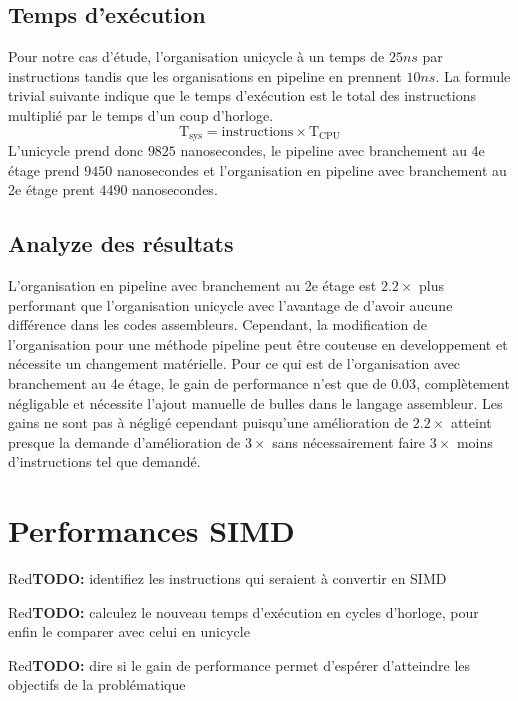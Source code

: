\documentclass[a11paper]{article}
\newcommand{\todo}[1]{\begin{color}{Red}\textbf{TODO:} #1\end{color}}
\begin{document}
\subsection{Temps d'exécution}
Pour notre cas d'étude, l'organisation unicycle à un temps de $25ns$ par instructions tandis que les organisations en pipeline en prennent $10ns$.
La formule trivial suivante indique que le temps d'exécution est le total des instructions multiplié par le temps d'un coup d'horloge.
$$
\text{T}_{\text{sys}} = \text{instructions}\times\text{T}_{\text{CPU}}
$$
L'unicycle prend donc $9825$ nanosecondes, le pipeline avec branchement au 4e étage prend $9450$ nanosecondes et l'organisation en pipeline
avec branchement au 2e étage prent $4490$ nanosecondes.

\subsection{Analyze des résultats}
L'organisation en pipeline avec branchement au 2e étage est $2.2\times$ plus performant que l'organisation unicycle avec l'avantage de d'avoir aucune différence dans
les codes assembleurs. Cependant, la modification de l'organisation pour une méthode pipeline peut être couteuse en developpement et nécessite un changement 
matérielle. Pour ce qui est de l'organisation avec branchement au 4e étage, le gain de performance n'est que de $0.03$, complètement négligable et nécessite l'ajout
manuelle de bulles dans le langage assembleur.
Les gains ne sont pas à négligé cependant puisqu'une amélioration de $2.2\times$ atteint presque la demande d'amélioration de $3\times$ sans nécessairement faire 
$3\times$ moins d'instructions tel que demandé.


\section{Performances SIMD}

\todo{identifiez les instructions qui seraient à convertir en SIMD}

\todo{calculez le nouveau temps d'exécution en cycles d'horloge, pour enfin le
comparer avec celui en unicycle}

\todo{dire si le gain de performance permet d'espérer d'atteindre les objectifs
de la problématique}
\end{document}
